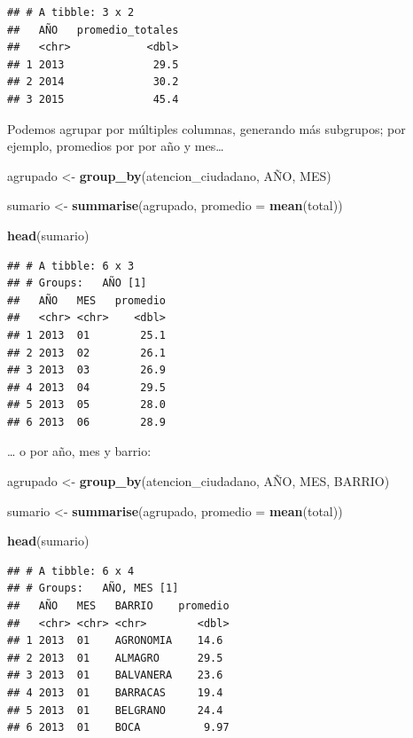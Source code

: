 \documentclass[]{book}
\newenvironment{Shaded}{\begin{snugshade}}{\end{snugshade}}
\newcommand{\KeywordTok}[1]{\textcolor[rgb]{0.13,0.29,0.53}{\textbf{#1}}}
\newcommand{\DataTypeTok}[1]{\textcolor[rgb]{0.13,0.29,0.53}{#1}}
\newcommand{\StringTok}[1]{\textcolor[rgb]{0.31,0.60,0.02}{#1}}
\newcommand{\NormalTok}[1]{#1}
\begin{document}
\begin{verbatim}
## # A tibble: 3 x 2
##   AÑO   promedio_totales
##   <chr>            <dbl>
## 1 2013              29.5
## 2 2014              30.2
## 3 2015              45.4
\end{verbatim}

Podemos agrupar por múltiples columnas, generando más subgrupos; por
ejemplo, promedios por por año y mes\ldots{}

\begin{Shaded}
\begin{Highlighting}[]
\NormalTok{agrupado <-}\StringTok{ }\KeywordTok{group_by}\NormalTok{(atencion_ciudadano, AÑO, MES)}

\NormalTok{sumario <-}\StringTok{ }\KeywordTok{summarise}\NormalTok{(agrupado, }\DataTypeTok{promedio =} \KeywordTok{mean}\NormalTok{(total))}

\KeywordTok{head}\NormalTok{(sumario)}
\end{Highlighting}
\end{Shaded}

\begin{verbatim}
## # A tibble: 6 x 3
## # Groups:   AÑO [1]
##   AÑO   MES   promedio
##   <chr> <chr>    <dbl>
## 1 2013  01        25.1
## 2 2013  02        26.1
## 3 2013  03        26.9
## 4 2013  04        29.5
## 5 2013  05        28.0
## 6 2013  06        28.9
\end{verbatim}

\ldots{} o por año, mes y barrio:

\begin{Shaded}
\begin{Highlighting}[]
\NormalTok{agrupado <-}\StringTok{ }\KeywordTok{group_by}\NormalTok{(atencion_ciudadano, AÑO, MES, BARRIO)}

\NormalTok{sumario <-}\StringTok{ }\KeywordTok{summarise}\NormalTok{(agrupado, }\DataTypeTok{promedio =} \KeywordTok{mean}\NormalTok{(total))}

\KeywordTok{head}\NormalTok{(sumario)}
\end{Highlighting}
\end{Shaded}

\begin{verbatim}
## # A tibble: 6 x 4
## # Groups:   AÑO, MES [1]
##   AÑO   MES   BARRIO    promedio
##   <chr> <chr> <chr>        <dbl>
## 1 2013  01    AGRONOMIA    14.6 
## 2 2013  01    ALMAGRO      29.5 
## 3 2013  01    BALVANERA    23.6 
## 4 2013  01    BARRACAS     19.4 
## 5 2013  01    BELGRANO     24.4 
## 6 2013  01    BOCA          9.97
\end{verbatim}
\end{document}
